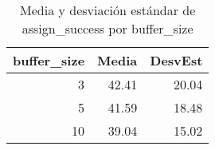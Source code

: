 \begin{table}
\caption{Media y desviación estándar de assign\_success por buffer_size}
\label{tab:buffer_size-stats}
\begin{tabular}{rrr}
\toprule
buffer_size & Media & DesvEst \\
\midrule
3 & 42.41 & 20.04 \\
5 & 41.59 & 18.48 \\
10 & 39.04 & 15.02 \\
\bottomrule
\end{tabular}
\end{table}
